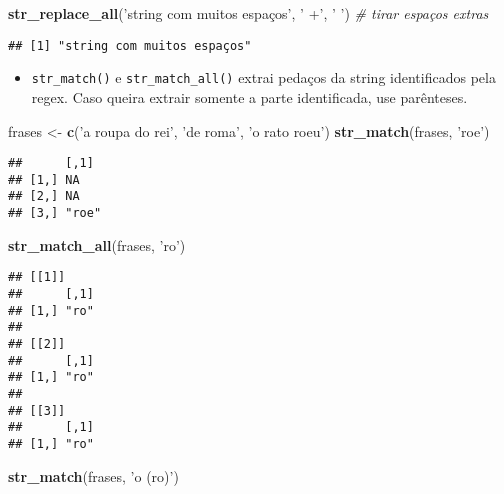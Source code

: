 \documentclass[]{book}
\newenvironment{Shaded}{\begin{snugshade}}{\end{snugshade}}
\newcommand{\KeywordTok}[1]{\textcolor[rgb]{0.13,0.29,0.53}{\textbf{{#1}}}}
\newcommand{\StringTok}[1]{\textcolor[rgb]{0.31,0.60,0.02}{{#1}}}
\newcommand{\CommentTok}[1]{\textcolor[rgb]{0.56,0.35,0.01}{\textit{{#1}}}}
\newcommand{\NormalTok}[1]{{#1}}
\providecommand{\tightlist}{%
  \setlength{\itemsep}{0pt}\setlength{\parskip}{0pt}}
\begin{document}
\begin{Shaded}
\begin{Highlighting}[]
\KeywordTok{str_replace_all}\NormalTok{(}\StringTok{'string     com    muitos espaços'}\NormalTok{, }\StringTok{' +'}\NormalTok{, }\StringTok{' '}\NormalTok{) }\CommentTok{# tirar espaços extras}
\end{Highlighting}
\end{Shaded}

\begin{verbatim}
## [1] "string com muitos espaços"
\end{verbatim}

\begin{itemize}
\tightlist
\item
  \texttt{str\_match()} e \texttt{str\_match\_all()} extrai pedaços da
  string identificados pela regex. Caso queira extrair somente a parte
  identificada, use parênteses.
\end{itemize}

\begin{Shaded}
\begin{Highlighting}[]
\NormalTok{frases <-}\StringTok{ }\KeywordTok{c}\NormalTok{(}\StringTok{'a roupa do rei'}\NormalTok{, }\StringTok{'de roma'}\NormalTok{, }\StringTok{'o rato roeu'}\NormalTok{)}
\KeywordTok{str_match}\NormalTok{(frases, }\StringTok{'roe'}\NormalTok{)}
\end{Highlighting}
\end{Shaded}

\begin{verbatim}
##      [,1] 
## [1,] NA   
## [2,] NA   
## [3,] "roe"
\end{verbatim}

\begin{Shaded}
\begin{Highlighting}[]
\KeywordTok{str_match_all}\NormalTok{(frases, }\StringTok{'ro'}\NormalTok{)}
\end{Highlighting}
\end{Shaded}

\begin{verbatim}
## [[1]]
##      [,1]
## [1,] "ro"
## 
## [[2]]
##      [,1]
## [1,] "ro"
## 
## [[3]]
##      [,1]
## [1,] "ro"
\end{verbatim}

\begin{Shaded}
\begin{Highlighting}[]
\KeywordTok{str_match}\NormalTok{(frases, }\StringTok{'o (ro)'}\NormalTok{)}
\end{Highlighting}
\end{Shaded}
\end{document}
